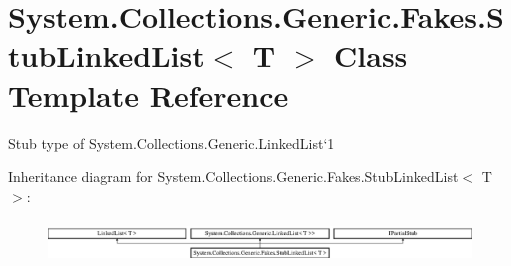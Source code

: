 \hypertarget{class_system_1_1_collections_1_1_generic_1_1_fakes_1_1_stub_linked_list_3_01_t_01_4}{\section{System.\-Collections.\-Generic.\-Fakes.\-Stub\-Linked\-List$<$ T $>$ Class Template Reference}
\label{class_system_1_1_collections_1_1_generic_1_1_fakes_1_1_stub_linked_list_3_01_t_01_4}
}


Stub type of System.\-Collections.\-Generic.\-Linked\-List`1 


Inheritance diagram for System.\-Collections.\-Generic.\-Fakes.\-Stub\-Linked\-List$<$ T $>$\-:\begin{figure}[H]
\begin{center}
\leavevmode
\includegraphics[height=1.134752cm]{class_system_1_1_collections_1_1_generic_1_1_fakes_1_1_stub_linked_list_3_01_t_01_4}
\end{center}
\end{figure}
